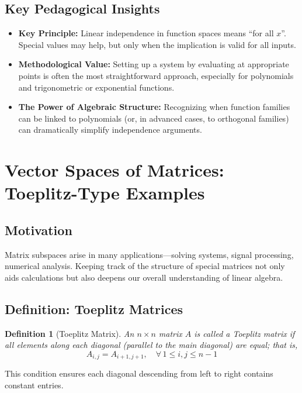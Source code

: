 \documentclass[12pt]{article}
\newtheorem{definition}[theorem]{Definition}
\begin{document}
\subsection{Key Pedagogical Insights}

\begin{itemize}
    \item \textbf{Key Principle:} Linear independence in function spaces means ``for all $x$''. Special values may help, but only when the implication is valid for all inputs.
    \item \textbf{Methodological Value:} Setting up a system by evaluating at appropriate points is often the most straightforward approach, especially for polynomials and trigonometric or exponential functions.
    \item \textbf{The Power of Algebraic Structure:} Recognizing when function families can be linked to polynomials (or, in advanced cases, to orthogonal families) can dramatically simplify independence arguments.
\end{itemize}

\section{Vector Spaces of Matrices: Toeplitz-Type Examples}

\subsection{Motivation}
Matrix subspaces arise in many applications—solving systems, signal processing, numerical analysis. Keeping track of the structure of special matrices not only aids calculations but also deepens our overall understanding of linear algebra.

\subsection{Definition: Toeplitz Matrices}

\begin{definition}[Toeplitz Matrix]
An $n \times n$ matrix $A$ is called a \emph{Toeplitz matrix} if all elements along each diagonal (parallel to the main diagonal) are equal; that is,
\[
A_{i,j} = A_{i+1,j+1}, \quad \forall\, 1 \leq i, j \leq n-1
\]
\end{definition}

This condition ensures each diagonal descending from left to right contains constant entries.
\end{document}
